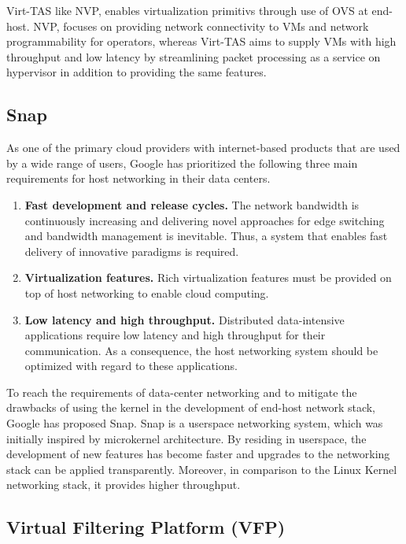 Virt-TAS like NVP, enables virtualization primitivs through use of OVS at end-host. 
NVP, focuses on providing network connectivity to VMs and network programmability 
for operators, whereas Virt-TAS aims to supply VMs with high throughput and low latency 
by streamlining packet processing as a service on hypervisor in addition to providing 
the same features.


\subsection{Snap}
\label{snap}

As one of the primary cloud providers with internet-based products that are used by a wide 
range of users, Google has prioritized the following three main requirements for host 
networking in their data centers. 

\begin{enumerate}
    \item \textbf{Fast development and release cycles.} The network bandwidth is continuously 
    increasing and delivering novel approaches for edge switching and bandwidth management is 
    inevitable. Thus, a system that enables fast delivery of innovative paradigms is required.

    \item \textbf{Virtualization features.} Rich virtualization features must be provided on 
    top of host networking to enable cloud computing.

    \item \textbf{Low latency and high throughput.} Distributed data-intensive applications 
    require low latency and high throughput for their communication. As a consequence, the 
    host networking system should be optimized with regard to these applications.

\end{enumerate}

To reach the requirements of data-center networking and to mitigate the drawbacks of using 
the kernel in the development of end-host network stack, Google has proposed Snap. Snap is 
a userspace networking system, which was initially inspired by microkernel architecture. 
By residing in userspace, the development of new features has become faster and upgrades to
the networking stack can be applied transparently. Moreover, in comparison to the Linux Kernel 
networking stack, it provides higher throughput.

\subsection{Virtual Filtering Platform (VFP)}
\label{vfp}


